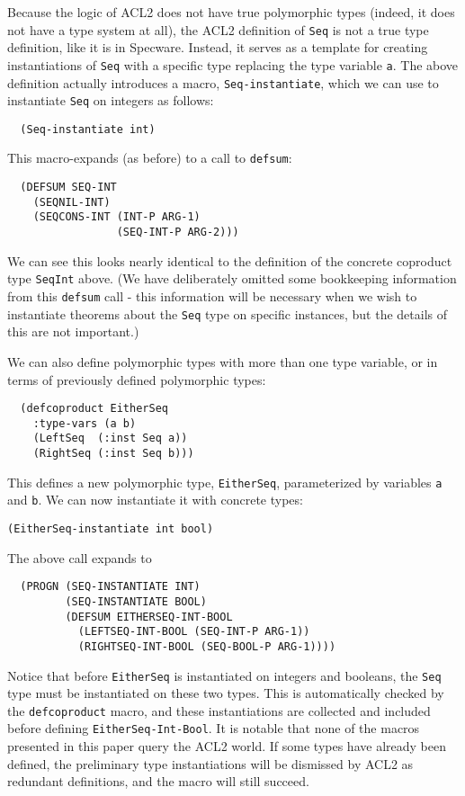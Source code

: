 \documentclass[]{eptcs}
\begin{document}
Because the logic of ACL2 does not have true polymorphic types (indeed, it does not have a type system at all), the ACL2 definition of \verb|Seq| is not a true type definition, like it is in Specware. Instead, it serves as a template for creating instantiations of \verb|Seq| with a specific type replacing the type variable \verb|a|. The above definition actually introduces a macro, \verb|Seq-instantiate|, which we can use to instantiate \verb|Seq| on integers as follows:
\begin{verbatim}
  (Seq-instantiate int)
\end{verbatim}
This macro-expands (as before) to a call to \verb|defsum|:
\begin{verbatim}
  (DEFSUM SEQ-INT
    (SEQNIL-INT)
    (SEQCONS-INT (INT-P ARG-1)
                 (SEQ-INT-P ARG-2)))
\end{verbatim}
We can see this looks nearly identical to the definition of the concrete coproduct type \verb|SeqInt| above. (We have deliberately omitted some bookkeeping information from this \verb|defsum| call - this information will be necessary when we wish to instantiate theorems about the \verb|Seq| type on specific instances, but the details of this are not important.)

We can also define polymorphic types with more than one type variable, or in terms of previously defined polymorphic types:
\begin{verbatim}
  (defcoproduct EitherSeq
    :type-vars (a b)
    (LeftSeq  (:inst Seq a))
    (RightSeq (:inst Seq b)))
\end{verbatim}
This defines a new polymorphic type, \verb|EitherSeq|, parameterized by variables \verb|a| and \verb|b|. We can now instantiate it with concrete types:
\begin{verbatim}
(EitherSeq-instantiate int bool)
\end{verbatim}
The above call expands to
\begin{verbatim}
  (PROGN (SEQ-INSTANTIATE INT)
         (SEQ-INSTANTIATE BOOL)
         (DEFSUM EITHERSEQ-INT-BOOL
           (LEFTSEQ-INT-BOOL (SEQ-INT-P ARG-1))
           (RIGHTSEQ-INT-BOOL (SEQ-BOOL-P ARG-1))))
\end{verbatim}
Notice that before \verb|EitherSeq| is instantiated on integers and booleans, the \verb|Seq| type must be instantiated on these two types. This is automatically checked by the \verb|defcoproduct| macro, and these instantiations are collected and included before defining \verb|EitherSeq-Int-Bool|. It is notable that none of the macros presented in this paper query the ACL2 world. If some types have already been defined, the preliminary type instantiations will be dismissed by ACL2 as redundant definitions, and the macro will still succeed.
\end{document}
